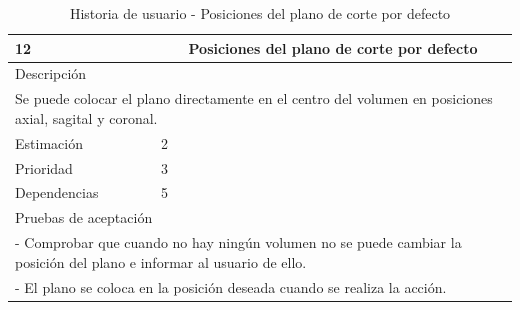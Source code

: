 \begin{table}[H]
	\begin{center}
		\begin{tabular} {|l|c|l|}
			\hline
			12 & \multicolumn{2}{c|}{Posiciones del plano de corte por defecto} \\ \hline \hline
			\multicolumn{3}{|l|}{Descripción} \\ \hline
			\multicolumn{3}{|p{12cm}|}{Se puede colocar el plano directamente en el centro del volumen en posiciones axial, sagital y coronal.} \\ \hline
			\multicolumn{2}{|l|}{Estimación} & 2 \\ \hline
			\multicolumn{2}{|l|}{Prioridad} & 3 \\ \hline
			\multicolumn{2}{|l|}{Dependencias} & 5 \\ \hline
			\multicolumn{3}{|l|}{Pruebas de aceptación} \\ \hline
			\multicolumn{3}{|p{12cm}|}{ - Comprobar que cuando no hay ningún volumen no se puede cambiar la posición del plano e informar al usuario de ello.} \\
			\multicolumn{3}{|p{12cm}|}{ - El plano se coloca en la posición deseada cuando se realiza la acción.} \\ \hline
		\end{tabular}
	\end{center}
	\caption{Historia de usuario - Posiciones del plano de corte por defecto}
	\label{tab:hu_posiciones_del_plano_de_corte_por_defecto}
\end{table}

